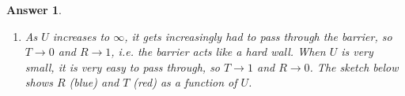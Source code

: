 \documentclass[a4paper]{article}
\newtheorem{ans}{Answer}[subsection]
\theoremstyle{new}
\begin{document}
\begin{ans}
\begin{enumerate}[label=(\roman*)]
$$    \right.$$ 
The boundary conditions are:
\begin{itemize}
    \item $\psi$ is continuous at the origin: $1+r=\tau$;
    \item $\frac{d\psi}{dx}$ is discontinuous at the origin: $ik(\tau-(1-r))=-\frac{2mU}{\hbar^2}(1+r)$.
\end{itemize}
Solving the simultaneous equations give
$$r=\frac{-2mU/\hbar^2}{\frac{2mU}{\hbar^2}+2ik}\implies R=|r|^2=\frac{\frac{mU^2}{\hbar^2}}{\frac{mU^2}{\hbar^2}+2E}$$
Then, $\tau=1+r=\frac{-2ik}{\frac{2mU}{\hbar^2}-2ik}$. Since $k$ same in $x<0$ and $x>0$, 
$$T=|\tau|^2=\frac{2E}{2E+\frac{mU^2}{\hbar^2}}$$
\item As $U$ increases to $\infty$, it gets increasingly had to pass through the barrier, so $T\rightarrow 0$ and $R\rightarrow 1$, i.e. the barrier acts like a hard wall. When $U$ is very small, it is very easy to pass through, so $T\rightarrow 1$ and $R\rightarrow 0$. The sketch below shows $R$ (blue) and $T$ (red) as a function of $U$.
\begin{center}
\end{center}
\end{enumerate}
\end{ans}
\newpage
\end{document}
